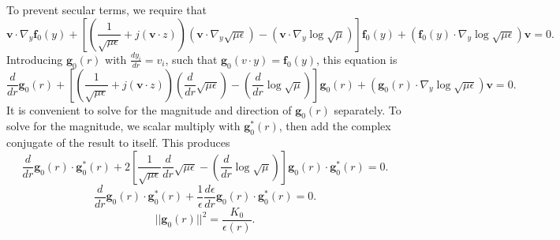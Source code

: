 \documentclass{article}
\newcommand{\norm}[1]{||#1||}
\theoremstyle{plain}
\begin{document}
To prevent secular terms, we require that
\begin{equation}
	\mathbf{v}\cdot\nabla_y\mathbf{f}_0(y)  + \left[ \left(\frac{1}{\sqrt{\mu\epsilon}}+j\left(\mathbf{v}\cdot z\right)\right)\left(\mathbf{v}\cdot\nabla_y\sqrt{\mu\epsilon}\right) - \left(\mathbf{v}\cdot\nabla_y\log{\sqrt{\mu}}\right)\right]\mathbf{f}_0(y)  + \left( \mathbf{f}_0(y)\cdot\nabla_y\log{\sqrt{\mu\epsilon}} \right)\mathbf{v} = 0.
\end{equation}
Introducing $\mathbf{g}_0(r)$ with $\frac{dy_i}{dr}=v_i$, such that $\mathbf{g}_0(v\cdot y) = \mathbf{f}_0(y)$, this equation is
\begin{equation}
	\frac{d}{dr}\mathbf{g}_0(r)  + \left[ \left(\frac{1}{\sqrt{\mu\epsilon}}+j\left(\mathbf{v}\cdot z\right)\right)\left(\frac{d}{dr}\sqrt{\mu\epsilon}\right) - \left(\frac{d}{dr}\log{\sqrt{\mu}}\right) \right]\mathbf{g}_0(r)  + \left( \mathbf{g}_0(r)\cdot\nabla_y\log{\sqrt{\mu\epsilon}} \right)\mathbf{v} = 0.
\end{equation}
It is convenient to solve for the magnitude and direction of $\mathbf{g}_0(r)$ separately. To solve for the magnitude, we scalar multiply with $\mathbf{g}^*_0(r)$, then add the complex conjugate of the result to itself. This produces
\begin{equation}
	\frac{d}{dr}\mathbf{g}_0(r)\cdot\mathbf{g}^*_0(r) + 2\left[ \frac{1}{\sqrt{\mu\epsilon}}\frac{d}{dr}\sqrt{\mu\epsilon} - \left(\frac{d}{dr}\log{\sqrt{\mu}}\right) \right]\mathbf{g}_0(r)\cdot\mathbf{g}^*_0(r) = 0.
\end{equation}
\begin{equation}
	\frac{d}{dr}\mathbf{g}_0(r)\cdot\mathbf{g}^*_0(r) + \frac{1}{\epsilon}\frac{d\epsilon}{dr}\mathbf{g}_0(r)\cdot\mathbf{g}^*_0(r) = 0.
\end{equation}
\begin{equation}
	\norm{\mathbf{g}_0(r)}^2 = \frac{K_0}{ \epsilon(r) }.
\end{equation}
\end{document}
